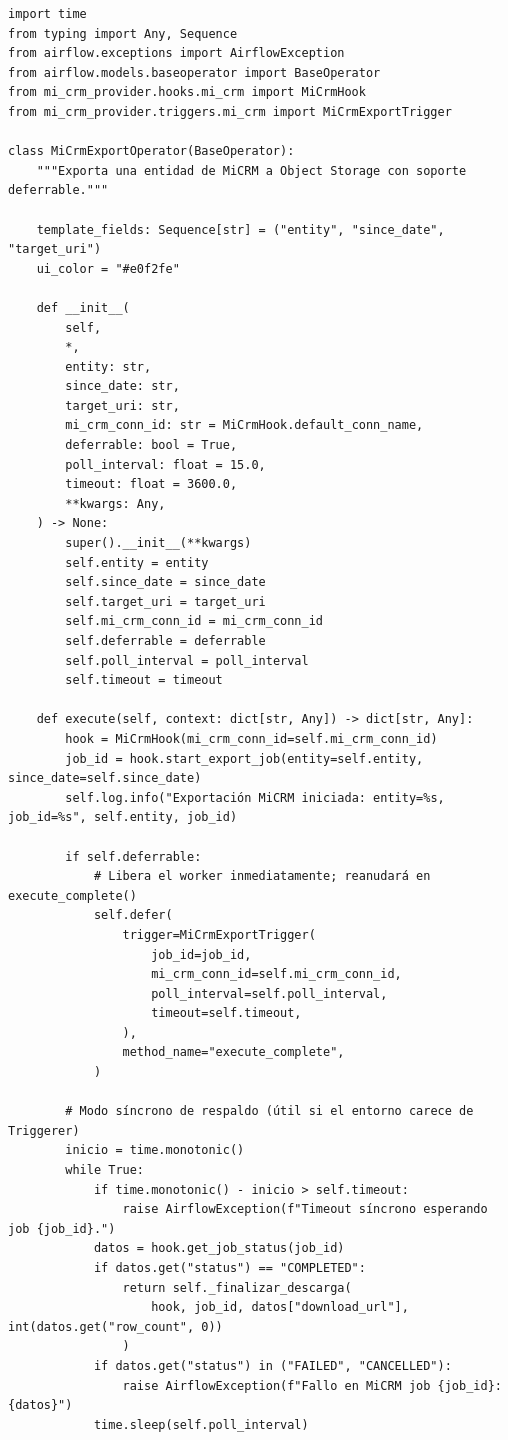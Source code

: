 \begin{lstlisting}[style=python, caption={Operador diferible (\texttt{mi\_crm\_provider/operators/mi\_crm.py}).}, label={lst:custom-operator}]
import time
from typing import Any, Sequence
from airflow.exceptions import AirflowException
from airflow.models.baseoperator import BaseOperator
from mi_crm_provider.hooks.mi_crm import MiCrmHook
from mi_crm_provider.triggers.mi_crm import MiCrmExportTrigger

class MiCrmExportOperator(BaseOperator):
    """Exporta una entidad de MiCRM a Object Storage con soporte deferrable."""

    template_fields: Sequence[str] = ("entity", "since_date", "target_uri")
    ui_color = "#e0f2fe"

    def __init__(
        self,
        *,
        entity: str,
        since_date: str,
        target_uri: str,
        mi_crm_conn_id: str = MiCrmHook.default_conn_name,
        deferrable: bool = True,
        poll_interval: float = 15.0,
        timeout: float = 3600.0,
        **kwargs: Any,
    ) -> None:
        super().__init__(**kwargs)
        self.entity = entity
        self.since_date = since_date
        self.target_uri = target_uri
        self.mi_crm_conn_id = mi_crm_conn_id
        self.deferrable = deferrable
        self.poll_interval = poll_interval
        self.timeout = timeout

    def execute(self, context: dict[str, Any]) -> dict[str, Any]:
        hook = MiCrmHook(mi_crm_conn_id=self.mi_crm_conn_id)
        job_id = hook.start_export_job(entity=self.entity, since_date=self.since_date)
        self.log.info("Exportación MiCRM iniciada: entity=%s, job_id=%s", self.entity, job_id)

        if self.deferrable:
            # Libera el worker inmediatamente; reanudará en execute_complete()
            self.defer(
                trigger=MiCrmExportTrigger(
                    job_id=job_id,
                    mi_crm_conn_id=self.mi_crm_conn_id,
                    poll_interval=self.poll_interval,
                    timeout=self.timeout,
                ),
                method_name="execute_complete",
            )

        # Modo síncrono de respaldo (útil si el entorno carece de Triggerer)
        inicio = time.monotonic()
        while True:
            if time.monotonic() - inicio > self.timeout:
                raise AirflowException(f"Timeout síncrono esperando job {job_id}.")
            datos = hook.get_job_status(job_id)
            if datos.get("status") == "COMPLETED":
                return self._finalizar_descarga(
                    hook, job_id, datos["download_url"], int(datos.get("row_count", 0))
                )
            if datos.get("status") in ("FAILED", "CANCELLED"):
                raise AirflowException(f"Fallo en MiCRM job {job_id}: {datos}")
            time.sleep(self.poll_interval)


\end{lstlisting}
